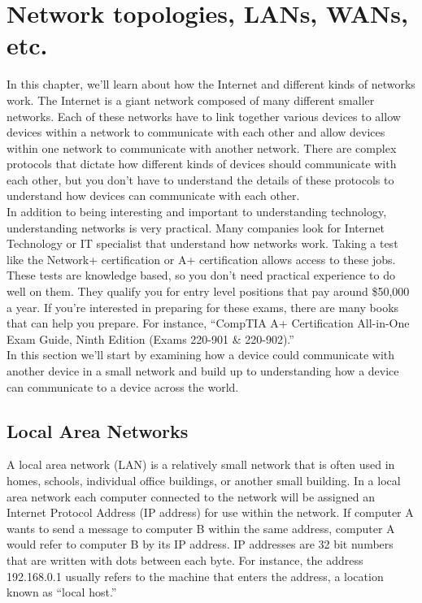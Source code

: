 \chapter{Network topologies, LANs, WANs, etc.}

In this chapter, we'll learn about how the Internet and different kinds of networks work. The Internet is a giant network composed of many different smaller networks. Each of these networks have to link together various devices to allow devices within a network to communicate with each other and allow devices within one network to communicate with another network. There are complex protocols that dictate how different kinds of devices should communicate with each other, but you don’t have to understand the details of these protocols to understand how devices can communicate with each other. \\

In addition to being interesting and important to understanding technology, understanding networks is very practical. Many companies look for Internet Technology or IT specialist that understand how networks work. Taking a test like the Network+ certification or A+ certification allows access to these jobs. These tests are knowledge based, so you don’t need practical experience to do well on them. They qualify you for entry level positions that pay around \$50,000 a year. If you’re interested in preparing for these exams, there are many books that can help you prepare. For instance, “CompTIA A+ Certification All-in-One Exam Guide, Ninth Edition (Exams 220-901 \& 220-902).” \\

In this section we’ll start by examining how a device could communicate with another device in a small network and build up to understanding how a device can communicate to a device across the world. \\

\section{Local Area Networks}

A local area network (LAN) is a relatively small network that is often used in homes, schools, individual office buildings, or another small building. In a local area network each computer connected to the network will be assigned an Internet Protocol Address (IP address) for use within the network. If computer A wants to send a message to computer B within the same address, computer A would refer to computer B by its IP address. IP addresses are 32 bit numbers that are written with dots between each byte. For instance, the address 192.168.0.1 usually refers to the machine that enters the address, a location known as “local host.” \\

